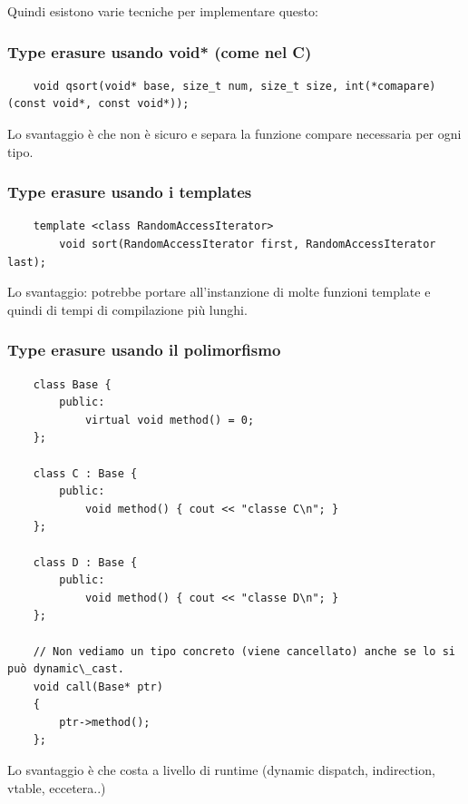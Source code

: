 \textsf{\small Quindi esistono varie tecniche per implementare questo: } \\

\subsubsection{Type erasure usando void* (come nel C)}

\begin{lstlisting}
	void qsort(void* base, size_t num, size_t size, int(*comapare)(const void*, const void*));
\end{lstlisting}

\textsf{\small Lo svantaggio è che non è sicuro e separa la funzione compare necessaria per ogni tipo.} \\

\subsubsection{Type erasure usando i templates}

\begin{lstlisting}
	template <class RandomAccessIterator>
		void sort(RandomAccessIterator first, RandomAccessIterator last);
\end{lstlisting}

\textsf{\small Lo svantaggio: potrebbe portare all'instanzione di molte funzioni template e quindi di tempi di compilazione più lunghi. } \\

\subsubsection{Type erasure usando il polimorfismo}

\begin{lstlisting}
	class Base { 
		public:
			virtual void method() = 0; 
	};
	
	class C : Base { 
		public:
			void method() { cout << "classe C\n"; } 
	};

	class D : Base { 
		public:
			void method() { cout << "classe D\n"; } 
	};
	
	// Non vediamo un tipo concreto (viene cancellato) anche se lo si può dynamic\_cast.
	void call(Base* ptr) 
	{ 
		ptr->method(); 
	};
\end{lstlisting}

\textsf{\small Lo svantaggio è che costa a livello di runtime (dynamic dispatch, indirection, vtable, eccetera..)} \\

